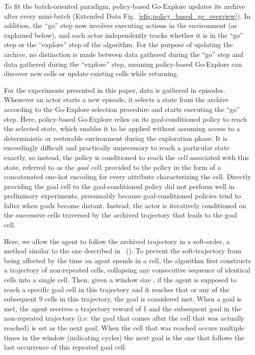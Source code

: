 \documentclass{nature}
\renewcommand*{\cite}[1]{\supercite{#1}}
\newcommand{\citefull}[1]{\citeauthor{#1}~(\citeyear{#1})\cite{#1}}
\begin{document}
\begin{methods}
To fit the batch-oriented paradigm, policy-based Go-Explore updates its archive after every mini-batch (Extended Data Fig.~\ref{efig:policy_based_ge_overview}).
In addition, the ``go'' step now involves executing actions in the environment (as explained below), and each actor 
independently tracks whether it is in the ``go'' step or the ``explore'' step of the algorithm. 
For the purpose of updating the archive, no distinction is made between data gathered during the ``go'' step and data gathered during the ``explore'' step, meaning policy-based Go-Explore can discover new cells or update existing cells while returning.

For the experiments presented in this paper, data is gathered in episodes.
Whenever an actor starts a new episode, it selects a state from the archive according to the Go-Explore selection procedure and starts executing the ``go'' step.
Here, policy-based Go-Explore relies on its goal-conditioned policy to reach the selected state, which enables it to be applied without assuming access to a deterministic or restorable environment during the exploration phase.
It is exceedingly difficult and practically unnecessary to reach a particular state exactly, so instead, the policy is conditioned to reach the \emph{cell} associated with this state, referred to as the \emph{goal cell}, provided to the policy in the form of a concatenated one-hot encoding for every attribute characterizing the cell.
Directly providing the goal cell to the goal-conditioned policy did not perform well in preliminary experiments, presumably because goal-conditioned policies tend to falter when goals become distant\cite{eysenbach2019search}.
Instead, the actor is iteratively conditioned on the successive cells traversed by the archived trajectory that leads to the goal cell.

Here, we allow the agent to follow the archived trajectory in a soft-order, a method similar to the one described in \citefull{guo2019efficient}. 
To prevent the soft-trajectory from being affected by the time an agent spends in a cell, the algorithm first constructs a trajectory of non-repeated cells, collapsing any consecutive sequence of identical cells into a single cell.
Then, given a window size , if the agent is supposed to reach a specific goal cell in this trajectory and it reaches that or any of the subsequent 9 cells in this trajectory, the goal is considered met.
When a goal is met, the agent receives a trajectory reward  of 1 and the subsequent goal in the non-repeated trajectory (i.e. the goal that comes after the cell that was actually reached) is set as the next goal.
When the cell that was reached occurs multiple times in the window (indicating cycles) the next goal is the one that follows the last occurrence of this repeated goal cell.



\end{methods}
\end{document}
